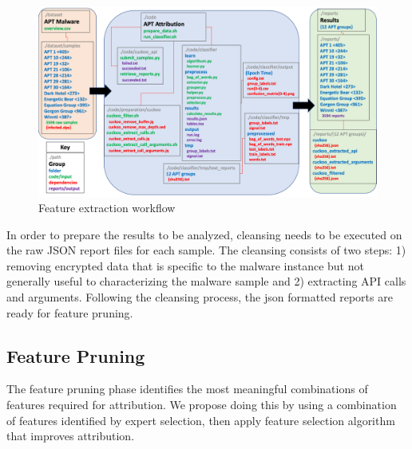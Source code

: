 \documentclass[12pt]{report}
\begin{document}
\begin{figure}
	\centering
	\includegraphics[width=1\textwidth]{images/APTAttribution-codebase-flow.png}
	\caption{Feature extraction workflow  \protect\cite{APTAttribution2022}}
	\label{fig:APTAttribution-codebase}
\end{figure}

In order to prepare the results to be analyzed, cleansing needs to be executed on the raw JSON report files for each sample.  The cleansing consists of two steps:  1) removing encrypted data that is specific to the malware instance but not generally useful to characterizing the malware sample and 2) extracting API calls and arguments.  Following the cleansing process, the json formatted reports are ready for feature pruning.  

\subsection{Feature Pruning}
The feature pruning phase identifies the most meaningful combinations of features required for attribution.  We propose doing this by using a combination of features identified by expert selection, then apply feature selection algorithm that improves attribution.
\end{document}

